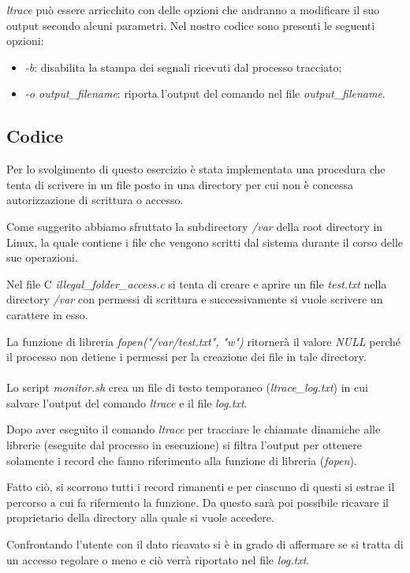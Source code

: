 \documentclass[a4paper, 12pt]{article}
\begin{document}
	\textit{ltrace} può essere arricchito con delle opzioni che andranno a modificare il suo output secondo alcuni parametri. Nel nostro codice sono presenti le seguenti opzioni:
	\begin{itemize}
		\item \textit{-b}: disabilita la stampa dei segnali ricevuti dal processo tracciato;
		\item \textit{-o output\_filename}: riporta l'output del comando nel file \textit{output\_filename}.
	\end{itemize}
	
	\subsection*{Codice}
	Per lo svolgimento di questo esercizio è stata implementata una procedura che tenta di scrivere in un file posto in una directory per cui non è concessa autorizzazione di scrittura o accesso.
	
	Come suggerito abbiamo sfruttato la subdirectory \textit{/var} della root directory in Linux, la quale contiene i file che vengono scritti dal sistema durante il corso delle sue operazioni.
	
	Nel file C \textit{illegal\_folder\_access.c} si tenta di creare e aprire un file \textit{test.txt} nella directory \textit{/var} con permessi di scrittura e successivamente si vuole scrivere un carattere in esso.
	
	La funzione di libreria \textit{fopen("/var/test.txt", "w")} ritornerà il valore \textit{NULL} perché il processo non detiene i permessi per la creazione dei file in tale directory.
	\\ \\
	Lo script \textit{monitor.sh} crea un file di testo temporaneo (\textit{ltrace\_log.txt}) in cui salvare l'output del comando \textit{ltrace} e il file \textit{log.txt}.
	
	Dopo aver eseguito il comando \textit{ltrace} per tracciare le chiamate dinamiche alle librerie (eseguite dal processo in esecuzione) si filtra l'output per ottenere solamente i record che fanno riferimento alla funzione di libreria (\textit{fopen}).
	
	Fatto ciò, si scorrono tutti i record rimanenti e per ciascuno di questi si estrae il percorso a cui fa rifermento la funzione. Da questo sarà poi possibile ricavare il proprietario della directory alla quale si vuole accedere.
	
	Confrontando l'utente con il dato ricavato si è in grado di affermare se si tratta di un accesso regolare o meno e ciò verrà riportato nel file \textit{log.txt}.
	
	
	
\end{document}
